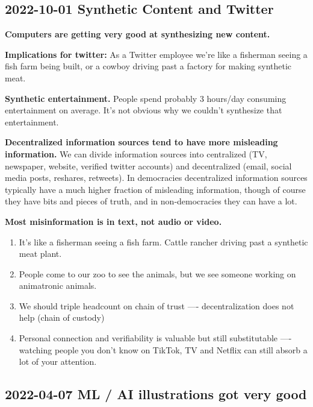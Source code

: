 \documentclass[
  11pt,
  letterpaper,
  DIV=11,
  numbers=noendperiod,
  oneside]{scrartcl}
\providecommand{\tightlist}{%
  \setlength{\itemsep}{0pt}\setlength{\parskip}{0pt}}\usepackage{longtable,booktabs,array}
\begin{document}
\hypertarget{synthetic-content-and-twitter}{%
\subsection{2022-10-01 \textbar{} Synthetic Content and
Twitter}\label{synthetic-content-and-twitter}}

\textbf{Computers are getting very good at synthesizing new content.}

\textbf{Implications for twitter:} As a Twitter employee we're like a
fisherman seeing a fish farm being built, or a cowboy driving past a
factory for making synthetic meat.

\textbf{Synthetic entertainment.} People spend probably 3 hours/day
consuming entertainment on average. It's not obvious why we couldn't
synthesize that entertainment.

\textbf{Decentralized information sources tend to have more misleading
information.} We can divide information sources into centralized (TV,
newspaper, website, verified twitter accounts) and decentralized (email,
social media posts, reshares, retweets). In democracies decentralized
information sources typically have a much higher fraction of misleading
information, though of course they have bits and pieces of truth, and in
non-democracies they can have a lot.

\textbf{Most misinformation is in text, not audio or video.}

\begin{enumerate}
\def\labelenumi{\arabic{enumi}.}
\tightlist
\item
  It's like a fisherman seeing a fish farm. Cattle rancher driving past
  a synthetic meat plant.
\item
  People come to our zoo to see the animals, but we see someone working
  on animatronic animals.
\item
  We should triple headcount on chain of trust ---- decentralization
  does not help (chain of custody)
\item
  Personal connection and verifiability is valuable but still
  substitutable ---- watching people you don't know on TikTok, TV and
  Netflix can still absorb a lot of your attention.
\end{enumerate}

\hypertarget{ml-ai-illustrations-got-very-good}{%
\subsection{2022-04-07 \textbar{} ML / AI illustrations got very
good}\label{ml-ai-illustrations-got-very-good}}
\end{document}
